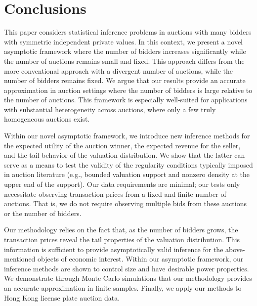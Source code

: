 

\section{Conclusions}\label{sec:conclusion}

This paper considers statistical inference problems in auctions with many bidders with symmetric independent private values. In this context, we present a novel asymptotic framework where the number of bidders increases significantly while the number of auctions remains small and fixed. This approach differs from the more conventional approach with a divergent number of auctions, while the number of bidders remains fixed. We argue that our results provide an accurate approximation in auction settings where the number of bidders is large relative to the number of auctions. This framework is especially well-suited for applications with substantial heterogeneity across auctions, where only a few truly homogeneous auctions exist.

Within our novel asymptotic framework, we introduce new inference methods for the expected utility of the auction winner, the expected revenue for the seller, and the tail behavior of the valuation distribution. We show that the latter can serve as a means to test the validity of the regularity conditions typically imposed in auction literature (e.g., bounded valuation support and nonzero density at the upper end of the support). Our data requirements are minimal; our tests only necessitate observing transaction prices from a fixed and finite number of auctions. That is, we do not require observing multiple bids from these auctions or the number of bidders.

Our methodology relies on the fact that, as the number of bidders grows, the transaction prices reveal the tail properties of the valuation distribution. This information is sufficient to provide asymptotically valid inference for the above-mentioned objects of economic interest. %
Within our asymptotic framework, our inference methods are shown to control size and have desirable power properties. We demonstrate through Monte Carlo simulations that our methodology provides an accurate approximation in finite samples. 
Finally, we apply our methods to Hong Kong license plate auction data.